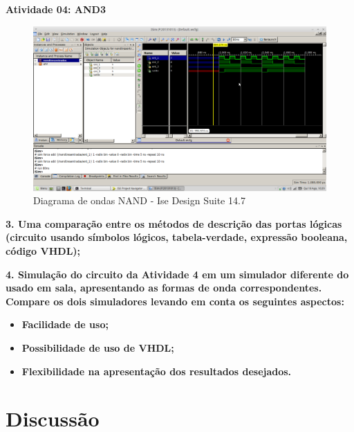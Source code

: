 \documentclass[12pts]{article}
\begin{document}
\newpage
\textbf{Atividade 04: AND3}

\begin{figure}[!htb]
  \centering
  \includegraphics[scale=0.3]{Atividade04}
  \caption{Diagrama de ondas NAND - Ise Design Suite 14.7}
  \label{figRotulo}
\end{figure}



\textbf{3. Uma comparação entre os métodos de descrição das portas lógicas (circuito usando símbolos lógicos, tabela-verdade, expressão booleana, código VHDL);}
\singlespacing



\textbf{4. Simulação do circuito da Atividade 4 em um simulador diferente do usado em sala, apresentando as formas de onda correspondentes. Compare os dois simuladores levando em conta os seguintes aspectos:}
\singlespacing
\begin{itemize}
	\item \textbf{Facilidade de uso;}
	\item \textbf{Possibilidade de uso de VHDL;}
	\item \textbf{Flexibilidade na apresentação dos resultados desejados.}
\end{itemize}


\section{Discussão}

\end{document}
